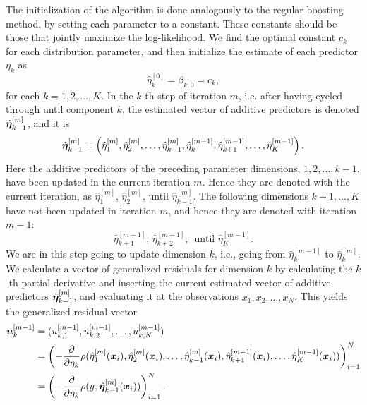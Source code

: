 The initialization of the algorithm is done analogously to the regular boosting method, by setting each parameter to a constant.
These constants should be those that jointly maximize the log-likelihood.
We find the optimal constant $c_k$ for each distribution parameter, and then initialize the estimate of each predictor $\eta_k$ as
\begin{equation*}
    \hat{\eta}_k^{[0]}=\beta_{k,0}=c_k,
\end{equation*}
for each $k=1,2,\ldots,K$.
In the $k$-th step of iteration $m$, i.e. after having cycled through until component $k$, the estimated vector of additive predictors is denoted $\hat{\boldsymbol{\eta}}_{k-1}^{[m]}$, and it is
\begin{equation*}
    \hat{\boldsymbol{\eta}}_{k-1}^{[m]}=\left(\hat{\eta}_1^{[m]},\hat{\eta}_2^{[m]},\ldots,\hat{\eta}_{k-1}^{[m]},\hat{\eta}_{k}^{[m-1]},\hat{\eta}_{k+1}^{[m-1]},\ldots,\hat{\eta}_{K}^{[m-1]}\right).
\end{equation*}
Here the additive predictors of the preceding parameter dimensions, $1,2,\ldots,k-1$, have been updated in the current iteration $m$.
Hence they are denoted with the current iteration, as $\hat{\eta}_1^{[m]}$, $\hat{\eta}_2^{[m]}$, until $\hat{\eta}_{k-1}^{[m]}$.
The following dimensions $k+1,\ldots,K$ have not been updated in iteration $m$, and hence they are denoted with iteration $m-1$:
\begin{equation*}
    \hat{\eta}_{k+1}^{[m-1]},\, \hat{\eta}_{k+2}^{[m-1]},\,\text{ until }\hat{\eta}_{K}^{[m-1]}.
\end{equation*}
We are in this step going to update dimension $k$, i.e., going from $\hat{\eta}_{k}^{[m-1]}$ to $\hat{\eta}_{k}^{[m]}$.
We calculate a vector of generalized residuals for dimension $k$ by calculating the $k$-th partial derivative and inserting the current estimated vector of additive predictors $\hat{\boldsymbol{\eta}}_{k-1}^{[m]}$, and evaluating it at the observations $x_1,x_2,\ldots,x_N$.
This yields the generalized residual vector
\begin{align*}
    \bm{u}_k^{[m-1]}&=(u_{k,1}^{[m-1]},u_{k,2}^{[m-1]},\ldots,u_{k,N}^{[m-1]})\\
    &=\left(-\frac{\partial}{\partial \eta_k}\rho(\hat{\eta}_1^{[m]}(\bm{x}_i),\hat{\eta}_2^{[m]}(\bm{x}_i),\ldots,\hat{\eta}_{k-1}^{[m]}(\bm{x}_i),\hat{\eta}_{k+1}^{[m-1]}(\bm{x}_i),\ldots,\hat{\eta}_{K}^{[m-1]}(\bm{x}_i))\right)_{i=1}^N \\
    &=\left(-\frac{\partial}{\partial \eta_k}\rho(y,\hat{\boldsymbol{\eta}}^{[m]}_{k-1}(\bm{x}_i))\right)_{i=1}^N.
\end{align*}
